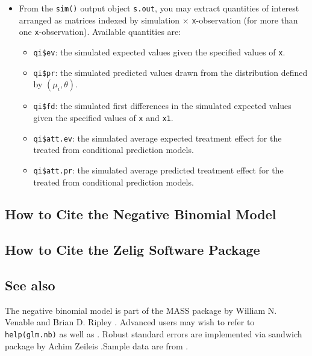 \begin{itemize}
\item From the {\tt sim()} output object {\tt s.out}, you may extract
  quantities of interest arranged as matrices indexed by simulation
  $\times$ {\tt x}-observation (for more than one {\tt x}-observation).
  Available quantities are:

   \begin{itemize}
   \item {\tt qi\$ev}: the simulated expected values given the specified
     values of {\tt x}.
   \item {\tt qi\$pr}: the simulated predicted values drawn from the
     distribution defined by $(\mu_i, \theta)$.  
   \item {\tt qi\$fd}: the simulated first differences in the
     simulated expected values given the specified values of {\tt x}
     and {\tt x1}.
   \item {\tt qi\$att.ev}: the simulated average expected treatment
     effect for the treated from conditional prediction models.  
   \item {\tt qi\$att.pr}: the simulated average predicted treatment
     effect for the treated from conditional prediction models.  
   \end{itemize}
\end{itemize}

\subsection*{How to Cite the Negative Binomial Model}

\subsection*{How to Cite the Zelig Software Package}
\CiteZelig

\subsection* {See also}
The negative binomial model is part of the MASS package by William N. Venable and Brian D. Ripley \citep{VenRip02}. Advanced users may wish to refer to \texttt{help(glm.nb)} as well as \cite{McCNel89}. Robust standard errors are implemented via sandwich package by Achim Zeileis \citep{Zeileis04}.Sample data are from \cite{Martin92}.



 